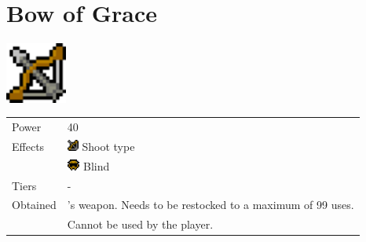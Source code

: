 \section{Bow of Grace}
\label{weapon:bow_of_grace}

\includegraphics[height=2cm,keepaspectratio]{./resources/weapons/bowofgrace}

\begin{longtable}{ l p{9cm} }
	Power
	& 40
\\ %
	Effects
	& \includegraphics[height=1em,keepaspectratio]{./resources/effects/shoot}
	Shoot type \\
	& \includegraphics[height=1em,keepaspectratio]{./resources/effects/blind}
	Blind
\\ %
	Tiers
	& -
\\ %
	Obtained
	& \nameref{char:phoebe}’s weapon. Needs to be restocked to a maximum of 99 uses. \\
	& Cannot be used by the player.
\end{longtable}
